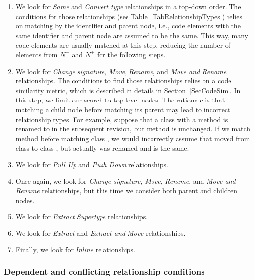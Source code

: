 \begin{enumerate}

\item We look for \textit{Same} and \textit{Convert type} relationships in a top-down order. The conditions for those relationships (see Table~\ref{TabRelationshipTypes}) relies on matching by the identifier and parent node, i.e., code elements with the same identifier and parent node are assumed to be the same.
This way, many code elements are usually matched at this step, reducing the number of elements from $N^-$ and $N^+$ for the following steps.

\item We look for \textit{Change signature}, \textit{Move}, \textit{Rename}, and \textit{Move and Rename} relationships.
The conditions to find those relationships relies on a code similarity metric, which is described in details in Section~\ref{SecCodeSim}.
In this step, we limit our search to top-level nodes.
The rationale is that matching a child node before matching its parent may lead to incorrect relationship types. For example, suppose that a class  with a method  is renamed to  in the subsequent revision, but method  is unchanged. If we match method  before matching class , we would incorrectly assume that  moved from class  to class , but actually  was renamed and  is the same.

\item We look for \textit{Pull Up} and \textit{Push Down} relationships.

\item Once again, we look for \textit{Change signature}, \textit{Move}, \textit{Rename}, and \textit{Move and Rename} relationships, but this time we consider both parent and children nodes.

\item We look for \textit{Extract Supertype} relationships.

\item We look for \textit{Extract} and \textit{Extract and Move} relationships.

\item Finally, we look for \textit{Inline} relationships.

\end{enumerate}


\subsubsection{Dependent and conflicting relationship conditions}

